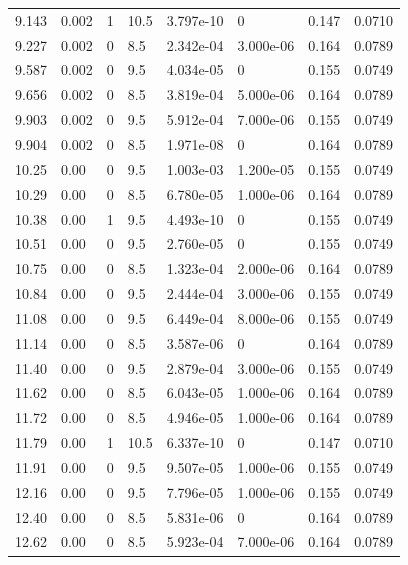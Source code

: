 \documentclass[preview]{standalone}
\begin{document}
{{{\begin{tabular}{L{1.2cm}C{1.2cm} C{0.3cm}C{0.5cm} C{1.4cm}C{1.4cm} C{1.4cm}C{1.4cm}}
  9.143  &  0.002  & 1     & 10.5 &  3.797e-10  & 0  & 0.147 &  0.0710   \\ 
  9.227  &  0.002  & 0     & 8.5 &  2.342e-04  & 3.000e-06  & 0.164 &  0.0789   \\ 
  9.587  &  0.002  & 0     & 9.5 &  4.034e-05  & 0  & 0.155 &  0.0749   \\ 
  9.656  &  0.002  & 0     & 8.5 &  3.819e-04  & 5.000e-06  & 0.164 &  0.0789   \\ 
  9.903  &  0.002  & 0     & 9.5 &  5.912e-04  & 7.000e-06  & 0.155 &  0.0749   \\ 
  9.904  &  0.002  & 0     & 8.5 &  1.971e-08  & 0  & 0.164 &  0.0789   \\ 
  10.25  &  0.00  & 0     & 9.5 &  1.003e-03  & 1.200e-05  & 0.155 &  0.0749   \\ 
  10.29  &  0.00  & 0     & 8.5 &  6.780e-05  & 1.000e-06  & 0.164 &  0.0789   \\ 
  10.38  &  0.00  & 1     & 9.5 &  4.493e-10  & 0  & 0.155 &  0.0749   \\ 
  10.51  &  0.00  & 0     & 9.5 &  2.760e-05  & 0  & 0.155 &  0.0749   \\ 
  10.75  &  0.00  & 0     & 8.5 &  1.323e-04  & 2.000e-06  & 0.164 &  0.0789   \\ 
  10.84  &  0.00  & 0     & 9.5 &  2.444e-04  & 3.000e-06  & 0.155 &  0.0749   \\ 
  11.08  &  0.00  & 0     & 9.5 &  6.449e-04  & 8.000e-06  & 0.155 &  0.0749   \\ 
  11.14  &  0.00  & 0     & 8.5 &  3.587e-06  & 0  & 0.164 &  0.0789   \\ 
  11.40  &  0.00  & 0     & 9.5 &  2.879e-04  & 3.000e-06  & 0.155 &  0.0749   \\ 
  11.62  &  0.00  & 0     & 8.5 &  6.043e-05  & 1.000e-06  & 0.164 &  0.0789   \\ 
  11.72  &  0.00  & 0     & 8.5 &  4.946e-05  & 1.000e-06  & 0.164 &  0.0789   \\ 
  11.79  &  0.00  & 1     & 10.5 &  6.337e-10  & 0  & 0.147 &  0.0710   \\ 
  11.91  &  0.00  & 0     & 9.5 &  9.507e-05  & 1.000e-06  & 0.155 &  0.0749   \\ 
  12.16  &  0.00  & 0     & 9.5 &  7.796e-05  & 1.000e-06  & 0.155 &  0.0749   \\ 
  12.40  &  0.00  & 0     & 8.5 &  5.831e-06  & 0  & 0.164 &  0.0789   \\ 
  12.62  &  0.00  & 0     & 8.5 &  5.923e-04  & 7.000e-06  & 0.164 &  0.0789   \\ 

\end{tabular}}}}
\end{document}
